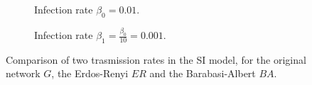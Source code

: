 \begin{figure}[H]
  \centering
  \begin{subfigure}{0.45\textwidth}
            \caption{Infection rate $\beta_0= 0.01$.}
            \label{fig:diff_si_1}
        \end{subfigure}
        \begin{subfigure}{0.45\textwidth}
            \caption{Infection rate $\beta_1= \frac{\beta_0}{10} =  0.001$. }
            \label{fig:diff_si_2}
          \end{subfigure}
          \caption{Comparison of two trasmission rates in the SI model, for the original network $G$, the Erdos-Renyi $ER$ and the Barabasi-Albert $BA$.}
          \label{fig:diff_si}
     \end{figure}

